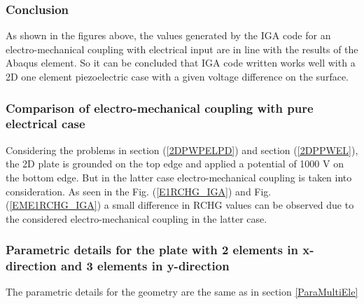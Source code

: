 \documentclass[11pt]{article}
\begin{document}
\subsubsection{Conclusion}
As shown in the figures above, the values generated by the IGA code for an electro-mechanical coupling with electrical input are in line with the results of the Abaqus element. So it can be concluded that IGA code written works well with a 2D one element piezoelectric case with a given voltage difference on the surface.

\subsubsection{Comparison of electro-mechanical coupling with pure electrical case}
Considering the problems in section (\ref{2DPWPELPD}) and section (\ref{2DPPWEL}), the 2D plate is grounded on the top edge and applied a potential of 1000 V on the bottom edge. But in the latter case electro-mechanical coupling is taken into consideration.
As seen in the Fig. (\ref{E1RCHG_IGA}) and Fig. (\ref{EME1RCHG_IGA}) a small difference in RCHG values can be observed due to the considered electro-mechanical coupling in the latter case.

\subsubsection{Parametric details for the plate with 2 elements in x-direction and  3 elements in y-direction}

The parametric details for the geometry are the same as in section \hyperref[ParaMultiEle]{\ref{ParaMultiEle}}
\end{document}
